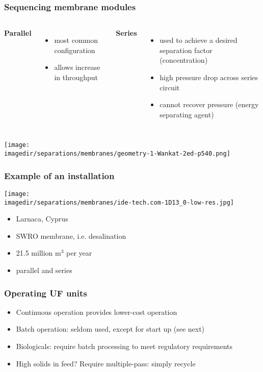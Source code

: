\begin{frame}\frametitle{Sequencing membrane modules}
	\begin{columns}[t]
			\textbf{Parallel}
			\begin{itemize}
				\item	most common configuration
				\item	allows increase in throughput
			\end{itemize}
			\textbf{Series}
			\begin{itemize}
				\item	used to achieve a desired separation factor (concentration)
				\item	high pressure drop across series circuit
				\item	cannot recover pressure (energy separating agent)
			\end{itemize}			
	\end{columns}
	\begin{center}
		\texttt{[image: \\imagedir/separations/membranes/geometry-1-Wankat-2ed-p540.png]}
	\end{center}
\end{frame}

\begin{frame}\frametitle{Example of an installation}
	\texttt{[image: \\imagedir/separations/membranes/ide-tech.com-1D13\_0-low-res.jpg]}
	\begin{itemize}
		\item	Larnaca, Cyprus
		\item	SWRO membrane, i.e. desalination
		\item	21.5 million $\text{m}^3$ per year
		\item	parallel and series
	\end{itemize}	
\end{frame}

\begin{frame}\frametitle{Operating UF units}
	\begin{itemize}
		\item	Continuous operation provides lower-cost operation
		\item	Batch operation: seldom used, except for start up (see next)
		\item	Biologicals: require batch processing to meet regulatory requirements
		\item	High solids in feed? Require multiple-pass: simply recycle
	\end{itemize}

\end{frame}

